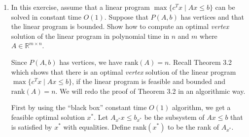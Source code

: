 \documentclass[11pt]{article}
\renewcommand{\leq}{\leqslant}
\newcommand{\rank}{\mathrm{rank}}
\begin{document}
\begin{enumerate}[1)]
\begin{solution}
\end{solution}



\item In this exercise, assume that a linear program $\max\{c^Tx \mid
  Ax\leq b \}$ can be solved in constant time $O(1)$. Suppose that $P(A,b)$
  has vertices and that the linear program is bounded. Show how to
  compute an optimal \emph{vertex} solution of the linear
  program in polynomial time in $n$ and $m$ where $A \in \mathbb{R}^{m \times n}$. 
  
\begin{solution}
Since $P(A,b)$ has vertices, we have $\rank(A) = n$. Recall Theorem 3.2 which shows that there is an optimal \emph{vertex} solution of the linear program $\max\{c^Tx \mid Ax\leq b \}$, if the linear program is feasible and bounded and $\rank(A)=n$.
We will redo the proof of Theorem 3.2 in an algorithmic way.

First by using the ``black box'' constant time $O(1)$ algorithm, we get a feasible optimal solution $x^*$. Let $A_{x^*} x \leq b_{x^*}$ be the subsystem of $Ax\leq b$ that is satisfied by $x^*$ with equalities. Define $\rank(x^*)$ to be the rank of $A_{x^*}$.


\end{solution}
\end{enumerate}
\end{document}
